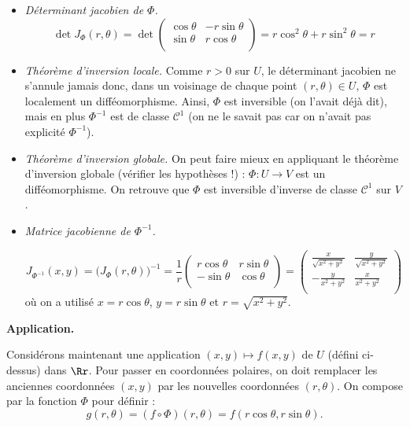 \documentclass[11pt, class=report,crop=false]{standalone}
\begin{document}
\begin{itemize}
    
\item \emph{Déterminant jacobien de $\Phi$.}   
$$\det J_\Phi(r,\theta) = \det \begin{pmatrix}
\cos \theta &-r\sin \theta \\
\sin \theta &r\cos \theta \\
\end{pmatrix}
= r\cos^2\theta + r\sin^2\theta = r$$

    
\item \emph{Théorème d'inversion locale.} 
  Comme $r>0$ sur $U$, le déterminant jacobien ne s'annule jamais donc, dans un voisinage de chaque point $(r,\theta) \in U$, $\Phi$ est localement un difféomorphisme. Ainsi, $\Phi$ est inversible (on l'avait déjà dit), mais en plus $\Phi^{-1}$ est de classe $\mathcal{C}^1$ (on ne le savait pas car on n'avait pas explicité $\Phi^{-1}$).
  


\item \emph{Théorème d'inversion globale.}
  On peut faire mieux en appliquant le théorème d'inversion globale (vérifier les hypothèses !) : $\Phi : U \to V$ est un difféomorphisme. On retrouve que $\Phi$ est inversible d'inverse de classe $\mathcal{C}^1$ sur $V$.
  
  
\item \emph{Matrice jacobienne de $\Phi^{-1}$.}

$$J_{\Phi^{-1}}(x,y) = \big( J_\Phi(r,\theta) \big)^{-1}
= 
\frac1r
\begin{pmatrix}
r\cos \theta &r\sin \theta \\
-\sin \theta &\cos \theta \\
\end{pmatrix}
= 
\begin{pmatrix}
\frac{x}{\sqrt{x^2+y^2}} & \frac{y}{\sqrt{x^2+y^2}} \\
-\frac{y}{x^2+y^2} & \frac{x}{x^2+y^2} \\
\end{pmatrix} 
$$
où on a utilisé $x=r\cos\theta$, $y=r\sin\theta$ et $r=\sqrt{x^2+y^2}$. 

\end{itemize}  
  
  \bigskip
  
\textbf{Application.}


Considérons maintenant une application $(x, y)\mapsto f(x,y)$ de $U$ (défini ci-dessus) dans $\Rr$. 
Pour \og{}passer en coordonnées polaires\fg{}, on doit remplacer les anciennes coordonnées $(x,y)$ par les nouvelles coordonnées $(r,\theta)$. 
On compose par la fonction $\Phi$ pour définir :
$$g(r,\theta) = (f \circ \Phi) (r,\theta)=f\left(r\cos\theta,r\sin\theta\right).$$
\end{document}
